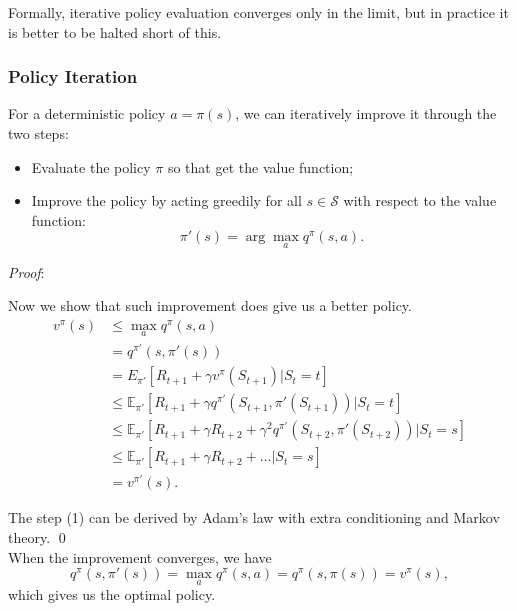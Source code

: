 \documentclass{progartcn}
\begin{document}
            Formally, iterative policy evaluation converges only in the limit, but in practice it is better to be halted short of this.\\

	\subsubsection{Policy Iteration}
			\label{sec: PI}

			For a deterministic policy $a =\pi(s)$, we can iteratively improve it through the two steps:
			\begin{itemize}[noitemsep,topsep=0pt]
				\item Evaluate the policy $\pi$ so that get the value function;
				\item Improve the policy by acting greedily for all $s\in\mathcal{S}$ with respect to the value function:
				\[\pi'(s)=\arg\max_{a}q^\pi(s,a).\]
			\end{itemize}

			\textit{Proof}:

			Now we show that such improvement does give us a better policy.
			\begin{align*}
			v^\pi(s)&\le \max_{a}q^\pi(s,a)\\
			&=q^{\pi'}(s,\pi'(s))\\
			&=E_{\pi'}[R_{t+1}+\gamma v^\pi(S_{t+1})|S_t=t]\\
			&\le \mathbb{E}_{\pi'}[R_{t+1}+\gamma q^{\pi'}(S_{t+1},\pi'(S_{t+1}))|S_t=t]\\
			&\le \mathbb{E}_{\pi'}[R_{t+1}+\gamma R_{t+2}+\gamma^2q^{\pi'}(S_{t+2},\pi'(S_{t+2}))|S_t=s]\tag{1}\\
			&\le \mathbb{E}_{\pi'}[R_{t+1}+\gamma R_{t+2}+...|S_t=s]\\
			&=v^{\pi'}(s).
			\end{align*}

			The step (1) can be derived by Adam's law with extra conditioning and Markov theory.
			\qed\\

			When the improvement converges, we have
			\[q^\pi(s,\pi'(s))=\max_{a} q^\pi(s,a)=q^\pi(s,\pi(s))=v^\pi(s),\]
			which gives us the optimal policy.\\
\end{document}
